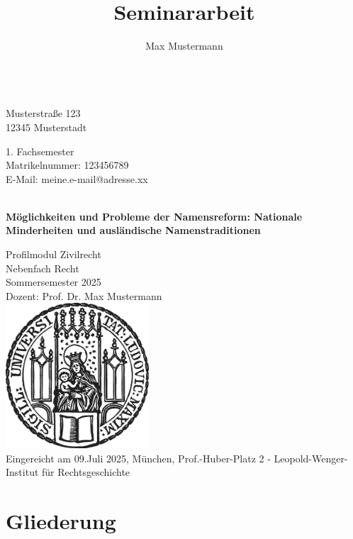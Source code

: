 \documentclass{jura}
\title{Seminararbeit}
\author{Max Mustermann}
\makeatletter
\renewcommand*{\frontmatter}{\cleardoublepage\pagenumbering{Roman}%
	\hsize\frontwidth\columnwidth\hsize\linewidth\hsize\textwidth\hsize}
\newcommand{\Matrikelnummer}[0]{123456789}
\newcommand{\EMail}[0]{meine.e-mail@adresse.xx}
\newcommand{\Adresse}[0]{Musterstraße 123\\ 12345 Musterstadt}
\newcommand{\Fachsemesternummer}[0]{1}
\newcommand{\Vorlesung}[0]{Profilmodul Zivilrecht}
\newcommand{\Semester}[0]{Sommersemester 2025}
\newcommand{\Dozent}[0]{Prof. Dr. Max Mustermann}
\newcommand{\Fachsemester}[0]{{\Fachsemesternummer}. Fachsemester}
\let\thetitle\@title
\let\theauthor\@author
\makeatother
\begin{document}
	
	\frontmatter
	\thispagestyle{empty}
	
	\textbf{\theauthor} \\
	\Adresse \par
	
	\Fachsemester \\
	Matrikelnummer: \Matrikelnummer \\
	E-Mail: \EMail \par
	
	\vspace{110pt}
	
	\begin{center}
		\textbf{{\fontsize{36}{48} \selectfont \thetitle}}\\
		\textbf{Möglichkeiten und Probleme der Namensreform: Nationale Minderheiten und ausländische Namenstraditionen} \par
		\vspace{20pt}
		\Large{\Vorlesung\\
			Nebenfach Recht\\
			\Semester\\
			Dozent: \Dozent\\}
		\vspace{10pt}
		\vfill
		\includegraphics[width = 0.4\textwidth]{sigillum.png}
		\normalsize
		\\
		\vspace{0.5cm}
		Eingereicht am 09.Juli 2025, München, Prof.-Huber-Platz 2 - Leopold-Wenger-Institut für Rechtsgeschichte
	\end{center}
	
	\newpage
	
	\onehalfspacing
	
	\section*{Gliederung}
	
\end{document}
